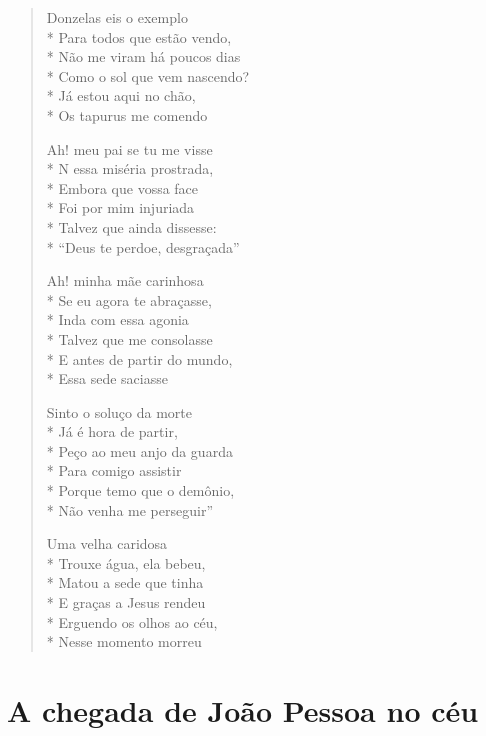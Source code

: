 \begin{verse}
Donzelas eis o exemplo\\*
Para todos que estão vendo,\\*
Não me viram há poucos dias\\*
Como o sol que vem nascendo?\\*
Já estou aqui no chão,\\*
Os tapurus me comendo

Ah! meu pai se tu me visse\\*
N essa miséria prostrada,\\*
Embora que vossa face\\*
Foi por mim injuriada\\*
Talvez que ainda dissesse:\\*
``Deus te perdoe, desgraçada''

Ah! minha mãe carinhosa\\*
Se eu agora te abraçasse,\\*
Inda com essa agonia\\*
Talvez que me consolasse\\*
E antes de partir do mundo,\\*
Essa sede saciasse

Sinto o soluço da morte\\*
Já é hora de partir,\\*
Peço ao meu anjo da guarda\\*
Para comigo assistir\\*
Porque temo que o demônio,\\*
Não venha me perseguir''

Uma velha caridosa\\*
Trouxe água, ela bebeu,\\*
Matou a sede que tinha\\*
E graças a Jesus rendeu\\*
Erguendo os olhos ao céu,\\*
Nesse momento morreu

\end{verse}

\paginabranca

\chapter{A chegada de João Pessoa no céu}

